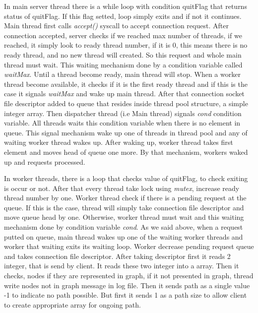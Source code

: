 \documentclass[letterpaper, 10 pt, conference]{ieeeconf}  %
\begin{document}
In main server thread there is a while loop with condition quitFlag that returns status of quitFlag. If this flag setted, loop simply exits and if not it continues. Main thread first calls \textit{accept()} syscall to accept connection request. After connection accepted, server checks if we reached max number of threads, if we reached, it simply look to ready thread number, if it is 0, this means there is no ready thread, and no new thread will created. So this request and whole main thread must wait. This waiting mechanism done by a condition variable called \textit{waitMax}. Until a thread become ready, main thread will stop. When a worker thread become available, it checks if it is the first ready thread and if this is the case it signals \textit{waitMax} and wake up main thread. After that connection socket file descriptor added to queue that resides inside thread pool structure, a simple integer array. Then dispatcher thread (i.e Main thread) signals \textit{cond} condition variable. All threads waits this condition variable when there is no element in queue. This signal mechanism wake up one of threads in thread pool and any of waiting worker thread wakes up. After waking up, worker thread takes first element and moves head of queue one more. By that mechanism, workers waked up and requests processed. 

In worker threads, there is a loop that checks value of quitFlag, to check exiting is occur or not. After that every thread take lock using \textit{mutex}, increase ready thread number by one. Worker thread check if there is a pending request at the queue. If this is the case, thread will simply take connection file descriptor and move queue head by one. Otherwise, worker thread must wait and this waiting mechanism done by condition variable \textit{cond}. As we said above, when a request putted on queue, main thread wakes up one of the waiting worker threads and worker that waiting exits its waiting loop. Worker decrease pending request queue and takes connection file descriptor. After taking descriptor first it reads 2 integer, that is send by client. It reads these two integer into a array. Then it checks, nodes if they are represented in graph, if it not presented in  graph, thread write nodes not in graph message in log file. Then it sends path as a single value -1 to indicate no path possible. But first it sends 1 as a path size to allow client to create appropriate array for ongoing path. 
\end{document}
